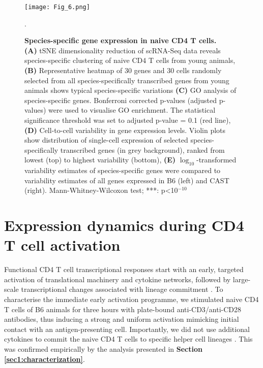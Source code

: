 \begin{figure}[!h]
\centering
\texttt{[image: Fig\_6.png]}
\caption[Species-specific gene expression in naive CD4\plus{} T cells]{\textbf{Species-specific gene expression in naive CD4\plus{} T cells.}\\
\textbf{(A)} tSNE dimensionality reduction of scRNA-Seq data reveals species-specific clustering of naive CD4\plus{} T cells from young animals, \textbf{(B)} Representative heatmap of 30 genes and 30 cells randomly selected from all species-specifically transcribed genes from young animals shows typical species-specific variations \textbf{(C)}  GO analysis of species-specific genes. Bonferroni corrected p-values (adjusted p-values) were used to visualise GO enrichment. The statistical significance threshold was set to adjusted p-value = 0.1 (red line), \textbf{(D)} Cell-to-cell variability in gene expression levels. Violin plots show distribution of single-cell expression of selected species-specifically transcribed genes (in grey background), ranked from lowest (top) to highest variability (bottom), \textbf{(E)} $\log_{10}$-transformed variability estimates of species-specific genes were compared to variability estimates of all genes expressed in B6 (left) and CAST (right). Mann-Whitney-Wilcoxon test; ***: p<10$^{-10}$}.
\label{fig1:species_specific}
\end{figure}

\newpage


\section{Expression dynamics during CD4\plus{} T cell activation}
\label{sec1:activation}

Functional CD4\plus{} T cell transcriptional responses start with an early, targeted activation of translational machinery and cytokine networks, followed by large-scale transcriptional changes associated with lineage commitment \citep{Shay2013, Asmal2003}. To characterise the immediate early activation programme, we stimulated naive CD4\plus{} T cells of B6 animals for three hours with plate-bound anti-CD3\textepsilon{}/anti-CD28 antibodies, thus inducing a strong and uniform activation mimicking initial contact with an antigen-presenting cell. Importantly, we did not use additional cytokines to commit the naive CD4\plus{} T cells to specific helper cell lineages \citep{Zhu2010}. This was confirmed empirically by the analysis presented in \textbf{Section \ref{sec1:characterization}}. 

